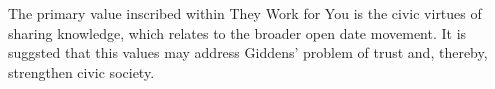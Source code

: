 The primary value inscribed within They Work for You is the civic virtues of sharing knowledge, which relates to the broader open date movement.
It is suggsted that this values may address Giddens' problem of trust and, thereby, strengthen civic society.

